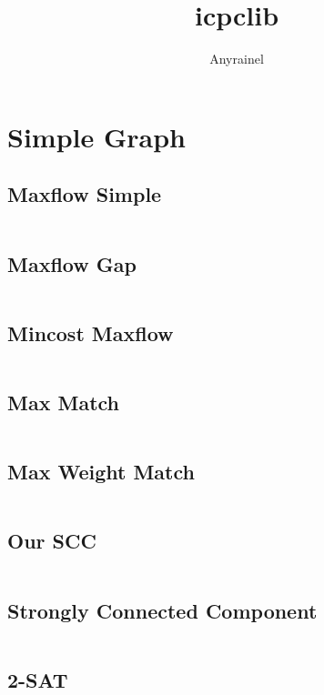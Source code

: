 \documentclass[a4paper]{article}
\title{icpclib}
\author{Anyrainel}
\begin{document}
\begingroup
\let\cleardoublepage\clearpage
\endgroup



  \tableofcontents
  \clearpage
  \section{Simple Graph}
  
  \subsection{Maxflow Simple}
  \inputminted{cpp}{src/our/maxflow_i.cpp}
  \subsection{Maxflow Gap}
  \inputminted{cpp}{src/our/maxflow_s.cpp}
  \subsection{Mincost Maxflow}
  \inputminted{cpp}{src/our/mincost_flow.cpp}
  
  \subsection{Max Match}
  \inputminted{cpp}{src/our/max_matching.cpp}
  \subsection{Max Weight Match}
  \inputminted{cpp}{src/our/max_weight_matching.cpp}
  
  \subsection{Our SCC}
  \inputminted{cpp}{src/our/strongly_connected_component.cpp}
  
  \subsection{Strongly Connected Component}
  \inputminted{cpp}{src/strongly-connected-component.cpp}
  
  \subsection{2-SAT}
  \inputminted{cpp}{src/2-sat.cpp}
  
\end{document}
